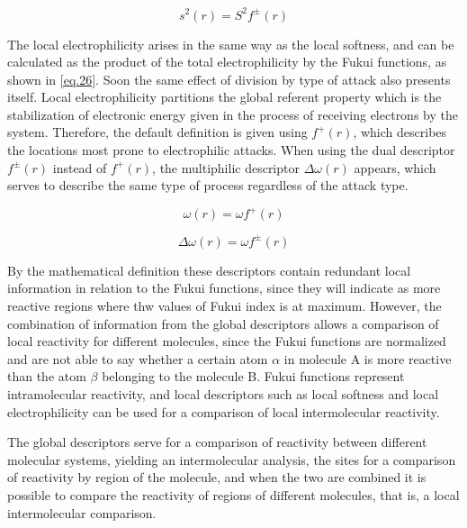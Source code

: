 \documentclass[a4paper,11pt]{refart}
\begin{document}
	\begin{equation}
	s^{2}(r) = S^2f^{\pm}(r)
	\label{eq.25}
	\end{equation}


	The local electrophilicity arises in the same way as the local softness, and can be calculated as the product of the total electrophilicity by the Fukui functions\cite{noorizadeh2013evaluation}, as shown in \autoref{eq.26}. Soon the same effect of division by type of attack also presents itself. Local electrophilicity partitions the global referent property which is the stabilization of electronic energy given in the process of receiving electrons by the system. Therefore, the default definition is given using $f^+(r)$, which describes the locations most prone to electrophilic attacks. When using the dual descriptor $f^{\pm}(r)$ instead of $f^+(r)$, the multiphilic descriptor $\Delta \omega(r)$ appears, which serves to describe the same type of process regardless of the attack type\cite{padmanabhan2007multiphilic}.

	\begin{equation}
	\omega(r) = \omega f^+(r)
	\label{eq.26}
	\end{equation}

	\begin{equation}
	\Delta \omega(r) = \omega f^{\pm}(r)
	\label{eq.27}
	\end{equation}

	By the mathematical definition these descriptors contain redundant local information in relation to the Fukui functions, since they will indicate as more reactive regions where thw values of Fukui index is at maximum. However, the combination of information from the global descriptors allows a comparison of local reactivity for different molecules, since the Fukui functions are normalized and are not able to say whether a certain atom $\alpha$ in molecule A is more reactive than the atom $\beta$ belonging to the molecule B\cite{Roy1998}. Fukui functions represent intramolecular reactivity, and local descriptors such as local softness and local electrophilicity can be used for a comparison of local intermolecular reactivity.

	The global descriptors serve for a comparison of reactivity between different molecular systems, yielding an intermolecular analysis, the sites for a comparison of reactivity by region of the molecule, and when the two are combined it is possible to compare the reactivity of regions of different molecules, that is, a local intermolecular comparison.
\end{document}
